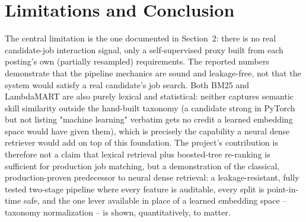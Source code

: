 \section{Limitations and Conclusion}
The central limitation is the one documented in Section~2: there is no real
candidate-job interaction signal, only a self-supervised proxy built from
each posting's own (partially resampled) requirements. The reported numbers
demonstrate that the pipeline mechanics are sound and leakage-free, not that
the system would satisfy a real candidate's job search. Both BM25 and
LambdaMART are also purely lexical and statistical: neither captures
semantic skill similarity outside the hand-built taxonomy (a candidate
strong in PyTorch but not listing "machine learning" verbatim gets no
credit a learned embedding space would have given them), which is precisely
the capability a neural dense retriever would add on top of this
foundation. The project's contribution is therefore not a claim that
lexical retrieval plus boosted-tree re-ranking is sufficient for production
job matching, but a demonstration of the classical, production-proven
predecessor to neural dense retrieval: a leakage-resistant, fully tested
two-stage pipeline where every feature is auditable, every split is
point-in-time safe, and the one lever available in place of a learned
embedding space -- taxonomy normalization -- is shown, quantitatively, to
matter.
